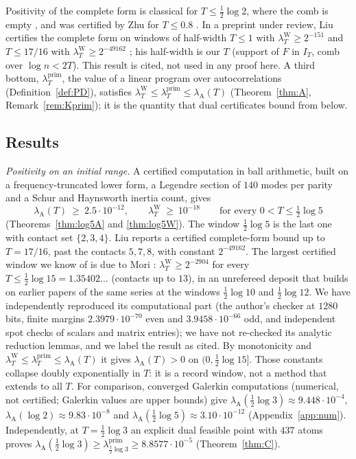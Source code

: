 \documentclass[11pt]{amsart}
\theoremstyle{definition}
\theoremstyle{remark}
\newcommand{\IT}{I_T}
\newcommand{\lamP}{\lambda^{\mathrm{prim}}_T}
\newcommand{\lamW}{\lambda^{\mathrm W}_T}
\newcommand{\lamA}{\lambda_{\mathrm A}(T)}
\begin{document}
Positivity of the complete form is classical for $T\le\frac12\log2$, where the comb is empty
\cite{Yoshida1992,Bombieri2000}, and was certified by Zhu for $T\le0.8$ \cite[Thm.~1.2]{Zhu2026}. In a preprint under review, Liu certifies the
complete form on windows of half-width $T\le1$ with $\lamW\ge2^{-151}$ and $T\le17/16$ with
$\lamW\ge2^{-49162}$ \cite[Thms.~A, B]{Liu2026}; his half-width is our $T$ (support of $F$ in $\IT$, comb
over $\log n<2T$). This result is cited, not used in any proof here. A
third bottom, $\lamP$, the value of a linear program over autocorrelations (Definition~\ref{def:PD}),
satisfies $\lamW\le\lamP\le\lamA$ (Theorem~\ref{thm:A}, Remark~\ref{rem:Kprim}); it is the quantity
that dual certificates bound from below.

\subsection{Results}
\emph{Positivity on an initial range.} A certified computation in ball arithmetic, built on a
frequency-truncated lower form, a Legendre section of $140$ modes per parity and a Schur and Haynsworth
inertia count, gives
\[
\lamA\ \ge\ 2.5\cdot10^{-12},\qquad \lamW\ \ge\ 10^{-18}\qquad\text{for every }0<T\le\tfrac12\log5
\]
(Theorems~\ref{thm:log5A} and \ref{thm:log5W}). The window $\frac12\log5$ is the last one with contact
set $\{2,3,4\}$. Liu \cite{Liu2026} reports a certified complete-form bound up to $T=17/16$, past the
contacts $5,7,8$, with constant $2^{-49162}$. The largest certified window we know of is due to Mori
\cite{Mori15}: $\lamW\ge2^{-2904}$ for every $T\le\frac12\log15=1.35402\ldots$ (contacts up to $13$), in
an unrefereed deposit that builds on earlier papers of the same series at the windows $\frac12\log10$ and
$\frac12\log12$. We have independently reproduced its computational part (the author's checker at
$1280$ bits, finite margins $2.3979\cdot10^{-70}$ even and $3.9458\cdot10^{-66}$ odd, and independent
spot checks of scalars and matrix entries); we have not re-checked its analytic reduction lemmas, and we
label the result as cited. By monotonicity and $\lamW\le\lamP\le\lamA$ it gives $\lamA>0$ on
$(0,\frac12\log15]$. Those constants collapse doubly exponentially in $T$: it is a record window,
not a method that extends to all $T$. For comparison, converged Galerkin computations (numerical, not certified; Galerkin
values are upper bounds) give $\lambda_{\mathrm A}(\frac12\log3)\approx9.448\cdot10^{-4}$,
$\lambda_{\mathrm A}(\log2)\approx9.83\cdot10^{-8}$ and $\lambda_{\mathrm A}(\frac12\log5)\approx3.10\cdot10^{-12}$
(Appendix~\ref{app:num}). Independently, at $T=\frac12\log3$ an explicit dual feasible point with $437$
atoms proves $\lambda_{\mathrm A}(\frac12\log3)\ge\lambda^{\mathrm{prim}}_{\frac12\log3}\ge8.8577\cdot10^{-5}$
(Theorem~\ref{thm:C}).
\end{document}
